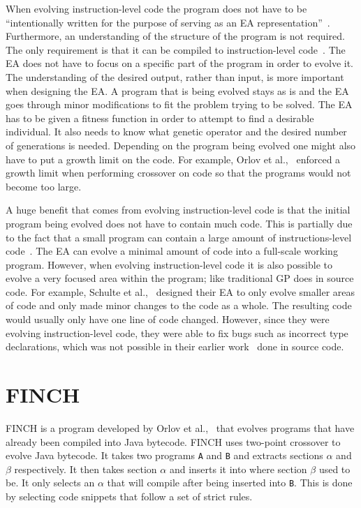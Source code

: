 \documentclass{sig-alternate}
\begin{document}
When evolving instruction-level code the program does not have to be ``intentionally written for the purpose of serving as an EA representation''~\cite{FINCH2:2009}. Furthermore, an understanding of the structure of the program is not required. The only requirement is that it can be compiled to instruction-level code~\cite{FINCH2:2009, Assembly:2010}. The EA does not have to focus on a specific part of the program in order to evolve it. The understanding of the desired output, rather than input, is more important when designing the EA. A program that is being evolved stays as is and the EA goes through minor modifications to fit the problem trying to be solved. The EA has to be given a fitness function in order to attempt to find a desirable individual. It also needs to know what genetic operator and the desired number of generations is needed. Depending on the program being evolved one might also have to put a growth limit on the code. For example, Orlov et al.,~\cite{FINCH:2011} enforced a growth limit when performing crossover on code so that the programs would not become too large.

A huge benefit that comes from evolving instruction-level code is that the initial program being evolved does not have to contain much code. This is partially due to the fact that a small program can contain a large amount of instructions-level code~\cite{Assembly:2010}. The EA can evolve a minimal amount of code into a full-scale working program. However, when evolving instruction-level code it is also possible to evolve a very focused area within the program; like traditional GP does in source code. For example, Schulte et al.,~\cite{Assembly:2010} designed their EA to only evolve smaller areas of code and only made minor changes to the code as a whole. The resulting code would usually only have one line of code changed. However, since they were evolving instruction-level code, they were able to fix bugs such as incorrect type declarations, which was not possible in their earlier work~\cite{Forrest:2009} done in source code. 

\section{FINCH}
FINCH is a program developed by Orlov et al.,~\cite{FINCH2:2009,FINCH:2011} that evolves programs that have already been compiled into Java bytecode. FINCH uses two-point crossover to evolve Java bytecode. It takes two programs \texttt{A} and \texttt{B} and extracts sections $\alpha$ and $\beta$ respectively. It then takes section $\alpha$ and inserts it into where section $\beta$ used to be. It only selects an $\alpha$ that will compile after being inserted into \texttt{B}. This is done by selecting code snippets that follow a set of strict rules. 
\end{document}
